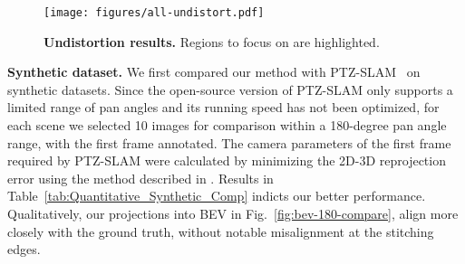 \begin{figure}[ht]
    \centering
    \texttt{[image: figures/all-undistort.pdf]}
    \caption{\textbf{Undistortion results.} Regions to focus on are highlighted.}
    \label{fig:all-undistort}
\end{figure}

\textbf{Synthetic dataset.}
We first compared our method with PTZ-SLAM~\cite{PTZ-SLAM} on synthetic datasets. Since the open-source version of PTZ-SLAM only supports a limited range of pan angles and its running speed has not been optimized, for each scene we selected 10 images for comparison within a 180-degree pan angle range, with the first frame annotated. The camera parameters of the first frame required by PTZ-SLAM were calculated by minimizing the 2D-3D reprojection error using the method described in \cite{hartley2003MVG}.
Results in Table~\ref{tab:Quantitative_Synthetic_Comp} indicts our better performance. Qualitatively, our projections into BEV in Fig.~\ref{fig:bev-180-compare}, align more closely with the ground truth, without notable misalignment at the stitching edges.

